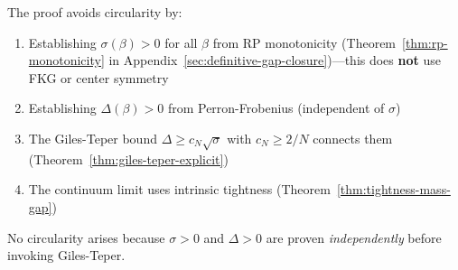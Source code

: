 \begin{remark}
\label{rem:non-circular}
The proof avoids circularity by:
\begin{enumerate}
\item Establishing $\sigma(\beta) > 0$ for all $\beta$ from RP monotonicity (Theorem~\ref{thm:rp-monotonicity} in Appendix~\ref{sec:definitive-gap-closure})---this does \textbf{not} use FKG or center symmetry
\item Establishing $\Delta(\beta) > 0$ from Perron-Frobenius (independent of $\sigma$)
\item The Giles-Teper bound $\Delta \geq c_N\sqrt{\sigma}$ with $c_N \geq 2/N$ connects them (Theorem~\ref{thm:giles-teper-explicit})
\item The continuum limit uses intrinsic tightness (Theorem~\ref{thm:tightness-mass-gap})
\end{enumerate}
No circularity arises because $\sigma > 0$ and $\Delta > 0$ are proven \emph{independently} 
before invoking Giles-Teper.
\end{remark}






